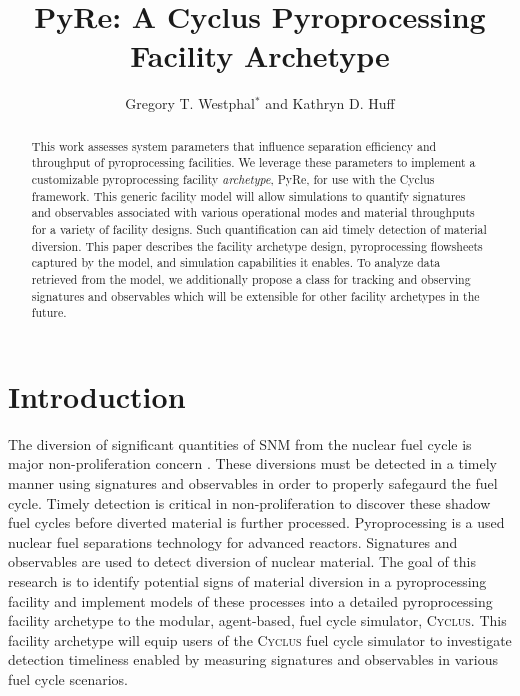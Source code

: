 \documentclass{anstrans}
\title{PyRe: A Cyclus Pyroprocessing Facility Archetype}
\author{Gregory T. Westphal$^*$ and Kathryn D. Huff}
\institute{
Dept. of Nuclear, Plasma and Radiological Engineering, University of Illinois at Urbana-Champaign \\
$^*$gtw2@illinois.edu
}
\newcommand{\Cyclus}{\textsc{Cyclus}\xspace}%
\begin{document}
\begin{abstract}
This work assesses system parameters that influence separation efficiency and 
throughput of pyroprocessing facilities. We leverage these parameters to implement a customizable pyroprocessing facility \emph{archetype}, \gls{PyRe}, for use with the Cyclus framework.
This generic facility model will allow simulations to 
quantify signatures and observables associated with various operational modes 
and material throughputs for a variety of facility designs. Such quantification 
can aid timely detection of material diversion. 
This paper describes the  facility archetype design, pyroprocessing flowsheets captured by the model, and simulation capabilities it enables. 
To analyze data retrieved from the model, we additionally propose a class for tracking and 
observing signatures and observables which will be extensible for other 
facility archetypes in the future.
\end{abstract}
\section{Introduction}
The diversion of significant quantities of \gls{SNM} from the nuclear fuel cycle is major non-proliferation 
concern \cite{noauthor_iaea_2017}. These diversions must be detected in a timely manner using signatures and observables in 
order to properly safegaurd the fuel cycle. Timely detection is critical in non-proliferation to discover these shadow fuel cycles
before diverted material is further processed. Pyroprocessing is a used nuclear fuel separations technology for advanced reactors. 
Signatures and observables are used to detect diversion of nuclear material.
The goal of this research is to identify potential signs of material diversion in a pyroprocessing facility and implement models 
of these processes into a detailed pyroprocessing facility archetype to the modular, agent-based, fuel cycle simulator, \Cyclus \cite{huff_fundamental_2016}. This facility archetype will equip users of the \Cyclus fuel cycle simulator to investigate 
detection timeliness enabled by measuring signatures and observables in various fuel cycle scenarios.
\end{document}
